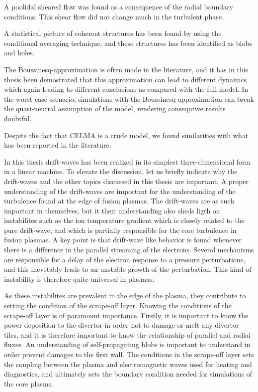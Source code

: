 A poolidal sheared flow was found as a consequence of the radial boundary conditions.
This shear flow did not change much in the turbulent phase.

A statistical picture of coherent structures has been found by using the conditional averaging technique, and these structures has been identified as blobs and holes.

The Boussinesq-approximation is often made in the literature, and it has in this thesis been demostrated that this approximation can lead to different dynaimcs which again leading to different conclusions as compared with the full model.
In the worst case scenario, simulations with the Boussinesq-approximation can break the quasi-neutral assumption of the model, rendering consequtive results doubtful.

Despite the fact that CELMA is a crude model, we found similarities with what has been reported in the literature.

In this thesis drift-waves has been realized in its simplest three-dimensional form in a linear machine.
To elevate the discussion, let us briefly indicate why the drift-waves and the other topics discussed in this thesis are important.
A proper understanding of the drift-waves are important for the understanding of the turbulence found at the edge of fusion plasmas.
The drift-waves are as such important in themselves, but it their understanding also sheds ligth on instabilites such as the ion temperature gradient which is closely related to the pure drift-wave, and which is partially responsible for the core turbulence in fusion plasmas.
A key point is that drift-wave like behavior is found whenever there is a difference in the parallel streaming of the electrons.
Several mechanisms are responsible for a delay of the electron response to a pressure perturbations, and this inevetably leads to an unstable growth of the perturbation.
This kind of instability is therefore quite universal in plasmas.

As these instabilites are prevalent in the edge of the plasma, they contribute to setting the condition of the scrape-off layer.
Knowing the conditions of the scrape-off layer is of paramount importance.
Firstly, it is important to know the power deposition to the divertor in order not to damage or melt any divertor tiles, and it is therefore important to know the relationship of parallel and radial fluxes.
An understanding of self-propagating blobs is important to understand in order prevent damages to the first wall.
The conditions in the scrape-off layer sets the coupling between the plasma and electromagnetic waves used for heating and diagnostics, and ultimately sets the boundary condition needed for simulations of the core plasma.

